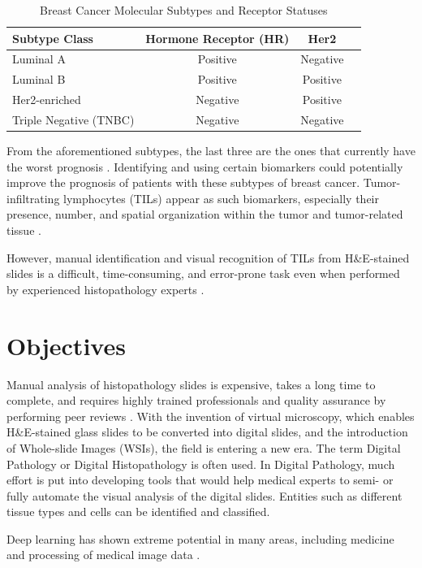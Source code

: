 \begin{table}[H]
 \centering
 \caption{Breast Cancer Molecular Subtypes and Receptor Statuses}
 \label{tab:breast_cancer_subtypes}
 \begin{tabular}{|l|c|c|c|}
 \hline
 \textbf{Subtype Class} & \textbf{Hormone Receptor (HR)} & \textbf{Her2} \\
 \hline
 Luminal A & Positive & Negative \\
 \hline
 Luminal B & Positive & Positive \\
 \hline
 Her2-enriched & Negative & Positive \\
 \hline
 Triple Negative (TNBC) & Negative & Negative \\
 \hline
 \end{tabular}
\end{table}

From the aforementioned subtypes, the last three are the ones that currently have the worst prognosis \cite{Schalper2022, Zhang2024}. Identifying and using certain biomarkers could potentially improve the prognosis of patients with these subtypes of breast cancer. Tumor-infiltrating lymphocytes (TILs) appear as such biomarkers, especially their presence, number, and spatial organization within the tumor and tumor-related tissue \cite{Salgado2015, Denkert2018, Amgad2019}.

However, manual identification and visual recognition of TILs from H\&E-stained slides is a difficult, time-consuming, and error-prone task even when performed by experienced histopathology experts \cite{Salgado2015, Amgad2019}.

\section{Objectives}
Manual analysis of histopathology slides is expensive, takes a long time to complete, and requires highly trained professionals and quality assurance by performing peer reviews \cite{Wemmert2021}. With the invention of virtual microscopy, which enables H\&E-stained glass slides to be converted into digital slides, and the introduction of Whole-slide Images (WSIs), the field is entering a new era. The term Digital Pathology or Digital Histopathology is often used. In Digital Pathology, much effort is put into developing tools that would help medical experts to semi- or fully automate the visual analysis of the digital slides. Entities such as different tissue types and cells can be identified and classified.

Deep learning has shown extreme potential in many areas, including medicine and processing of medical image data \cite{LeCun2015}.

